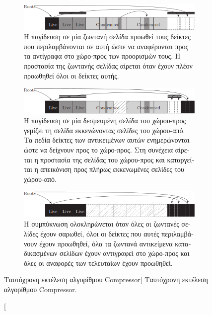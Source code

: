 \begin{greek}
\begin{figure}
  \begin{subfigure}[b]{1.0\textwidth}
    \includegraphics{figures/conc_2c}
    \caption
      {Η παγίδευση σε μία ζωντανή σελίδα προωθεί τους δείκτες
       που περιλαμβάνονται σε αυτή ώστε να αναφέρονται προς
       τα αντίγραφα στο χώρο-προς των προορισμών τους. Η προστασία
       της ζωντανής σελίδας αίρεται όταν έχουν πλέον προωθηθεί
       όλοι οι δείκτες αυτής.}
  \end{subfigure}
  
  \begin{subfigure}[b]{1.0\textwidth}
    \includegraphics{figures/conc_2d}
    \caption
      {Η παγίδευση σε μία δεσμευμένη σελίδα του χώρου-προς
       γεμίζει τη σελίδα εκκενώνοντας σελίδες του χώρου-από.
       Τα πεδία δείκτες των αντικειμένων αυτών ενημερώνονται
       ώστε να δείχνουν προς το χώρο-προς. Στη συνέχεια αίρεται
       η προστασία της σελίδας του χώρου-προς και καταργείται
       η απεικόνιση προς πλήρως εκκενωμένες σελίδες του
       χώρου-από.}
  \end{subfigure}
  
  \begin{subfigure}[b]{1.0\textwidth}
    \includegraphics{figures/conc_2e}
    \caption
      {Η συμπύκνωση ολοκληρώνεται όταν όλες οι ζωντανές
       σελίδες έχουν σαρωθεί, όλοι οι δείκτες που αυτές
       περιλαμβάνουν έχουν προωθηθεί, όλα τα ζωντανά
       αντικείμενα καταδικασμένων σελίδων έχουν αντιγραφεί
       στο χώρο-προς και όλες οι αναφορές των τελευταίων
       έχουν προωθηθεί.}
  \end{subfigure}    
  \caption
    [Ταυτόχρονη εκτέλεση αλγορίθμου Compressor]
    {Ταυτόχρονη εκτέλεση αλγορίθμου Compressor.}
  \label{fig:conc_2}
\end{figure}


\end{greek}
